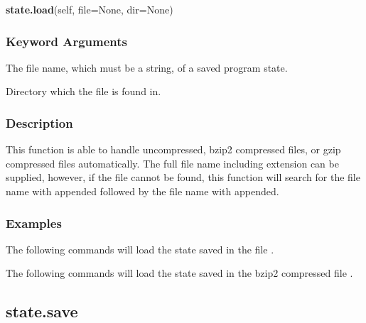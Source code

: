 \textsf{\textbf{state.load}(self, file=None, dir=None)}


\subsubsection{Keyword Arguments}


  The file name, which must be a string, of a saved program state.

  Directory which the file is found in.

\subsubsection{Description}

This function is able to handle uncompressed,  bzip2  compressed files, or gzip  compressed
files automatically.  The full file name including extension can be supplied, however, if
the file cannot be found, this function will search for the file name with 
 appended
followed by the file name with 
 appended.


\subsubsection{Examples}

The following commands will load the state saved in the file 
.





The following commands will load the state saved in the bzip2  compressed file 
.







\newpage

\subsection{state.save}


